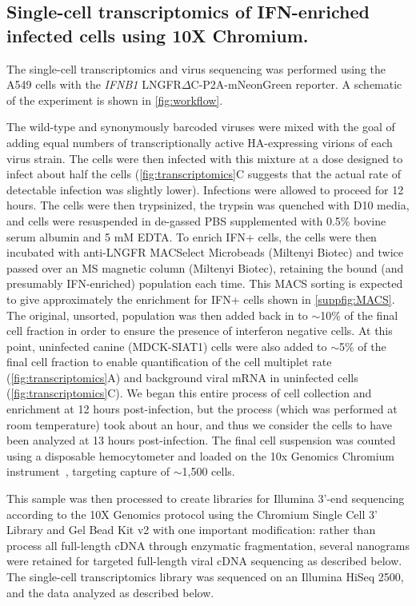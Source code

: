 \documentclass[lineno]{asm-article}
\newcommand{\FIG}[1]{\autoref{fig:#1}}
\newcommand{\SUPPFIG}[1]{\autoref{suppfig:#1}}
\begin{document}
\subsection{Single-cell transcriptomics of IFN-enriched infected cells using 10X Chromium.}
The single-cell transcriptomics and virus sequencing was performed using the A549 cells with the \textit{IFNB1} LNGFR$\Delta$C-P2A-mNeonGreen reporter.
A schematic of the experiment is shown in \FIG{workflow}.

The wild-type and synonymously barcoded viruses were mixed with the goal of adding equal numbers of transcriptionally active HA-expressing virions of each virus strain.
The cells were then infected with this mixture at a dose designed to infect about half the cells (\FIG{transcriptomics}C suggests that the actual rate of detectable infection was slightly lower).
Infections were allowed to proceed for 12 hours.
The cells were then trypsinized, the trypsin was quenched with D10 media, and cells were resuspended in de-gassed PBS supplemented with 0.5\% bovine serum albumin and 5 mM EDTA. 
To enrich IFN+ cells, the cells were then incubated with anti-LNGFR MACSelect Microbeads (Miltenyi Biotec) and twice passed over an MS magnetic column (Miltenyi Biotec), retaining the bound (and presumably IFN-enriched) population each time. 
This MACS sorting is expected to give approximately the enrichment for IFN+ cells shown in \SUPPFIG{MACS}.
The original, unsorted, population was then added back in to $\sim$10\% of the final cell fraction in order to ensure the presence of interferon negative cells. 
At this point, uninfected canine (MDCK-SIAT1) cells were also added to $\sim$5\% of the final cell fraction to enable quantification of the cell multiplet rate (\FIG{transcriptomics}A) and background viral mRNA in uninfected cells (\FIG{transcriptomics}C). 
We began this entire process of cell collection and enrichment at 12 hours post-infection, but the process (which was performed at room temperature) took about an hour, and thus we consider the cells to have been analyzed at 13 hours post-infection.
The final cell suspension was counted using a disposable hemocytometer and loaded on the 10x Genomics Chromium instrument~\cite{zheng2017massively}, targeting capture of $\sim$1,500 cells. 

This sample was then processed to create libraries for Illumina 3'-end sequencing according to the 10X Genomics protocol using the Chromium Single Cell 3' Library and Gel Bead Kit v2 with one important modification: rather than process all full-length cDNA through enzymatic fragmentation, several nanograms were retained for targeted full-length viral cDNA sequencing as described below.
The single-cell transcriptomics library was sequenced on an Illumina HiSeq 2500, and the data analyzed as described below.
\end{document}

